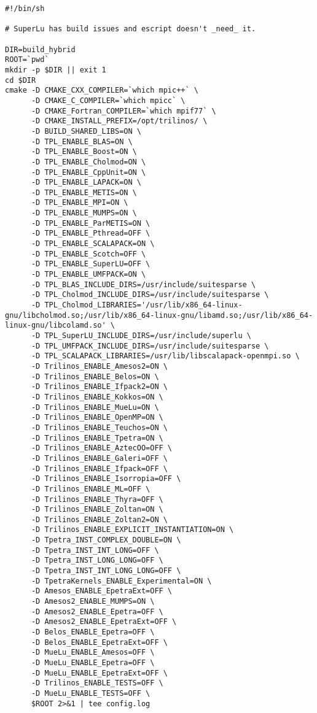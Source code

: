\begin{verbatim}
#!/bin/sh

# SuperLu has build issues and escript doesn't _need_ it.

DIR=build_hybrid
ROOT=`pwd`
mkdir -p $DIR || exit 1
cd $DIR
cmake -D CMAKE_CXX_COMPILER=`which mpic++` \
      -D CMAKE_C_COMPILER=`which mpicc` \
      -D CMAKE_Fortran_COMPILER=`which mpif77` \
      -D CMAKE_INSTALL_PREFIX=/opt/trilinos/ \
      -D BUILD_SHARED_LIBS=ON \
      -D TPL_ENABLE_BLAS=ON \
      -D TPL_ENABLE_Boost=ON \
      -D TPL_ENABLE_Cholmod=ON \
      -D TPL_ENABLE_CppUnit=ON \
      -D TPL_ENABLE_LAPACK=ON \
      -D TPL_ENABLE_METIS=ON \
      -D TPL_ENABLE_MPI=ON \
      -D TPL_ENABLE_MUMPS=ON \
      -D TPL_ENABLE_ParMETIS=ON \
      -D TPL_ENABLE_Pthread=OFF \
      -D TPL_ENABLE_SCALAPACK=ON \
      -D TPL_ENABLE_Scotch=OFF \
      -D TPL_ENABLE_SuperLU=OFF \
      -D TPL_ENABLE_UMFPACK=ON \
      -D TPL_BLAS_INCLUDE_DIRS=/usr/include/suitesparse \
      -D TPL_Cholmod_INCLUDE_DIRS=/usr/include/suitesparse \
      -D TPL_Cholmod_LIBRARIES='/usr/lib/x86_64-linux-gnu/libcholmod.so;/usr/lib/x86_64-linux-gnu/libamd.so;/usr/lib/x86_64-linux-gnu/libcolamd.so' \
      -D TPL_SuperLU_INCLUDE_DIRS=/usr/include/superlu \
      -D TPL_UMFPACK_INCLUDE_DIRS=/usr/include/suitesparse \
      -D TPL_SCALAPACK_LIBRARIES=/usr/lib/libscalapack-openmpi.so \
      -D Trilinos_ENABLE_Amesos2=ON \
      -D Trilinos_ENABLE_Belos=ON \
      -D Trilinos_ENABLE_Ifpack2=ON \
      -D Trilinos_ENABLE_Kokkos=ON \
      -D Trilinos_ENABLE_MueLu=ON \
      -D Trilinos_ENABLE_OpenMP=ON \
      -D Trilinos_ENABLE_Teuchos=ON \
      -D Trilinos_ENABLE_Tpetra=ON \
      -D Trilinos_ENABLE_AztecOO=OFF \
      -D Trilinos_ENABLE_Galeri=OFF \
      -D Trilinos_ENABLE_Ifpack=OFF \
      -D Trilinos_ENABLE_Isorropia=OFF \
      -D Trilinos_ENABLE_ML=OFF \
      -D Trilinos_ENABLE_Thyra=OFF \
      -D Trilinos_ENABLE_Zoltan=ON \
      -D Trilinos_ENABLE_Zoltan2=ON \
      -D Trilinos_ENABLE_EXPLICIT_INSTANTIATION=ON \
      -D Tpetra_INST_COMPLEX_DOUBLE=ON \
      -D Tpetra_INST_INT_LONG=OFF \
      -D Tpetra_INST_LONG_LONG=OFF \
      -D Tpetra_INST_INT_LONG_LONG=OFF \
      -D TpetraKernels_ENABLE_Experimental=ON \
      -D Amesos_ENABLE_EpetraExt=OFF \
      -D Amesos2_ENABLE_MUMPS=ON \
      -D Amesos2_ENABLE_Epetra=OFF \
      -D Amesos2_ENABLE_EpetraExt=OFF \
      -D Belos_ENABLE_Epetra=OFF \
      -D Belos_ENABLE_EpetraExt=OFF \
      -D MueLu_ENABLE_Amesos=OFF \
      -D MueLu_ENABLE_Epetra=OFF \
      -D MueLu_ENABLE_EpetraExt=OFF \
      -D Trilinos_ENABLE_TESTS=OFF \
      -D MueLu_ENABLE_TESTS=OFF \
      $ROOT 2>&1 | tee config.log
\end{verbatim}
